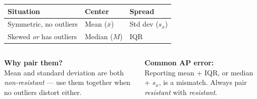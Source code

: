 \documentclass[aspectratio=169, 11pt]{beamer}
\begin{document}
{
\begin{frame}[t, plain]
  \vspace{1em}%
  \hspace{0.55cm}%
  \begin{minipage}{0.9\textwidth}
    \small
    \begin{center}
    \renewcommand{\arraystretch}{1.6}
    \begin{tabular}{p{} p{} p{}}
    \rowcolor{navy}\color{white}\textbf{Situation} &
    \color{white}\textbf{Center} &
    \color{white}\textbf{Spread} \\
    \midrule
    Symmetric, no outliers & Mean ($\bar{x}$) & Std dev ($s_x$) \\
    Skewed \textit{or} has outliers & Median ($M$) & IQR \\
    \end{tabular}
    \end{center}

    \vspace{0.5cm}
    \begin{columns}[t]
        \textbf{\color{navy}Why pair them?}\\[4pt]
        Mean and standard deviation are both \textit{non-resistant} --- use them together
        when no outliers distort either.

        \textbf{\color{navy}Common AP error:}\\[4pt]
        Reporting mean + IQR, or median + $s_x$, is a mismatch.
        Always pair \textit{resistant} with \textit{resistant}.
    \end{columns}
  \end{minipage}
\end{frame}
}
\end{document}
